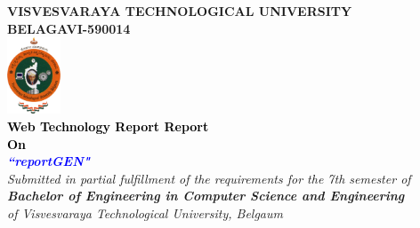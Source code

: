 \thispagestyle{empty}
\begin{titlepage}
\begin{center}
\textup{\large{\textcolor{darkbrown}{\bf VISVESVARAYA TECHNOLOGICAL UNIVERSITY} \\ {\textcolor{darkbrown}{\bf BELAGAVI-590014}}}}\\
\includegraphics[width=0.12\textwidth]{./../static/media/VTU.png}\\
\textup{\small{\textcolor{black}{\textbf{Web Technology Report Report} \\ {\textbf{On}}}}} \\
\textup{\large{\textcolor{blue}{\textbf{\textit{``reportGEN"}}}}} \\[0.2in]

\textup{{\textit {Submitted in partial fulfillment of the requirements for the 7th semester of} \\ {\textbf {\textit {Bachelor of Engineering in Computer Science and Engineering}} \\ \textit {of Visvesvaraya Technological University, Belgaum}}}}\\


\end{center}
\end{titlepage}
